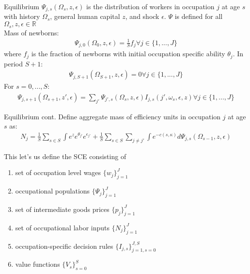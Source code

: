 \documentclass{beamer}
\begin{document}
\begin{frame}{Equilibrium}
  $\Psi_{j,s}(\Omega_s, z, \epsilon)$ is the distribution of workers in occupation $j$ at age $s$ with history $\Omega_s$, general human capital $z$, and shock $\epsilon$. $\Psi$ is defined for all $\Omega_s, z, \epsilon \in \mathbb{R}$\\
  \pause
  Mass of newborns:
  \begin{gather*}
    \Psi_{j,0}(\Omega_0, z, \epsilon) = \frac{1}{S}f_j \forall j\in\{1,...,J\}
  \end{gather*}
  where $f_j$ is the fraction of newborns with initial occupation specific ability $\theta_j$.
  \pause
  In period $S+1$:
  \begin{gather*}
    \Psi_{j,S+1}(\Omega_{S+1}, z, \epsilon) = 0 \forall j\in\{1,...,J\}
  \end{gather*}
  \pause
  For $s=0,...,S$:
  \begin{gather*}
    \Psi_{j,s+1}(\Omega_{s+1}, z', \epsilon) = \sum_{j'}\Psi_{j',s}(\Omega_s, z, \epsilon)I_{j,s}(j', \omega_s, \epsilon, z) \forall j\in\{1,...,J\}
  \end{gather*}
\end{frame}

\begin{frame}{Equilibrium cont.}
  Define aggregate mass of efficiency units in occupation $j$ at age $s$ as:
  \begin{gather*}
    N_j = \frac{1}{S} \sum_{s\in S}\int e^ze^{\theta_{j'}}e^{\epsilon_{j'}} + \frac{1}{S}\sum_{s\in S}\sum_{j\ne j'}\int e^{-c(s, \kappa)}d\Psi_{j,s}(\Omega_{s-1}, z, \epsilon) 
  \end{gather*}
  \pause

  This let's us define the SCE consisting of 
  \begin{enumerate}
    \item set of occupation level wages $\{w_j\}_{j=1}^J$
    \item occupational populations $\{\Psi_j\}_{j=1}^J$
    \item set of intermediate goods prices $\{p_j\}_{j=1}^J$
    \item set of occupational labor inputs $\{N_j\}_{j=1}^J$
    \item occupation-specific decision rules $\{I_{j,s}\}_{j=1,s=0}^{J,S}$
    \item value functions $\{V_s\}_{s=0}^S$
  \end{enumerate}
\end{frame}
\end{document}
